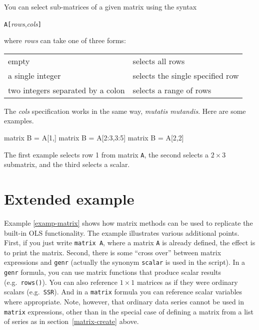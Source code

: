 You can select sub-matrices of a given matrix using the syntax

\texttt{A[}\textsl{rows},\textsl{cols}\texttt{]}

where \textsl{rows} can take one of three forms:

\begin{center}
\begin{tabular}{ll}
empty & selects all rows \\
a single integer & selects the single specified row \\
two integers separated by a colon & selects a range of rows 
\end{tabular}
\end{center}

The \textsl{cols} specification works in the same way, \textit{mutatis
  mutandis}.  Here are some examples.
%
\begin{code}
matrix B = A[1,]
matrix B = A[2:3,3:5]
matrix B = A[2,2]
\end{code}
%
The first example selects row 1 from matrix \texttt{A}, the second
selects a $2\times 3$ submatrix, and the third selects a scalar.

\section{Extended example}
\label{matrix-example}

Example \ref{examp-matrix} shows how matrix methods can be used to
replicate the built-in OLS functionality.  The example illustrates
various additional points.  First, if you just write \texttt{matrix
  A}, where a matrix \texttt{A} is already defined, the effect is to
print the matrix.  Second, there is some ``cross over'' between matrix
expressions and \texttt{genr} (actually the synonym \texttt{scalar} is
used in the script).  In a \texttt{genr} formula, you can use matrix
functions that produce scalar results (e.g.\ \texttt{rows()}).  You
can also reference $1\times 1$ matrices as if they were ordinary
scalars (e.g.\ \texttt{SSR}).  And in a \texttt{matrix} formula you
can reference scalar variables where appropriate.  Note, however, that
ordinary data series cannot be used in \texttt{matrix} expressions,
other than in the special case of defining a matrix from a list of
series as in section~\ref{matrix-create} above.

